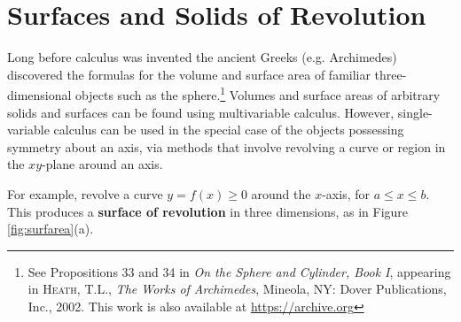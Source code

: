 \section{Surfaces and Solids of Revolution}
Long before calculus was invented the ancient Greeks (e.g. Archimedes)
discovered the formulas for the volume and surface area of familiar
three-dimensional objects such as the sphere.\footnote{See Propositions 33 and
34 in \emph{On the Sphere and Cylinder, Book I}, appearing in
\textsc{Heath, T.L.}, \emph{The Works of Archimedes}, Mineola, NY: Dover
Publications, Inc., 2002. This work is also available at
\url{https://archive.org}} Volumes and surface
areas of arbitrary solids and surfaces can be found using multivariable
calculus. However, single-variable calculus can be used in the special case of
the objects possessing symmetry about an axis, via methods that involve
revolving a curve or region in the $xy$-plane around an
axis.

For example, revolve a curve $y=f(x) \ge 0$ around the $x$-axis, for
$a \le x \le b$. This produces a \textbf{surface of revolution} in three
dimensions, as in Figure \ref{fig:surfarea}(a).

